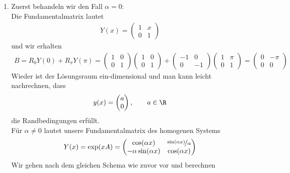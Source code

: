 \begin{solution}
\begin{enumerate}[label = \textbf{\alph*)}]
  \item Zuerst behandeln wir den Fall $\alpha = 0$: \\
    Die Fundamentalmatrix lautet
    \begin{align*}
      Y(x) = \begin{pmatrix}
        1 & x \\ 0 & 1
      \end{pmatrix}
    \end{align*}
    und wir erhalten
    \begin{align*}
      B = R_0Y(0) + R_{\pi}Y(\pi) =
      \begin{pmatrix}
        1 & 0 \\ 0 & 1
      \end{pmatrix}
      \begin{pmatrix}
        1 & 0  \\ 0 & 1
      \end{pmatrix}
      + \begin{pmatrix}
        -1 & 0 \\ 0 & -1
      \end{pmatrix}
      \begin{pmatrix}
        1 & \pi  \\ 0 & 1
      \end{pmatrix}
      = \begin{pmatrix}
        0 & -\pi \\ 0 & 0
      \end{pmatrix}
    \end{align*}
    Wieder ist der Lösungsraum ein-dimensional und man kann leicht nachrechnen, dass
    \begin{align*}
      y(x) = \begin{pmatrix}
        a \\ 0
      \end{pmatrix}, \qquad a \in \R
    \end{align*}
    die Randbedingungen erfüllt. \\
  Für $\alpha \neq 0$ lautet unsere Fundamentalmatrix des homogenen Systems
  \begin{align*}
    Y(x) = \exp(xA) = \begin{pmatrix}
      \cos(\alpha x) & \nicefrac{\sin(\alpha x)}{\alpha}  \\ -\alpha\sin(\alpha x) & \cos(\alpha x)
    \end{pmatrix}
  \end{align*}
  Wir gehen nach dem gleichen Schema wie zuvor vor und berechnen
  \begin{align*}

\end{align*}
\end{enumerate}
\end{solution}

